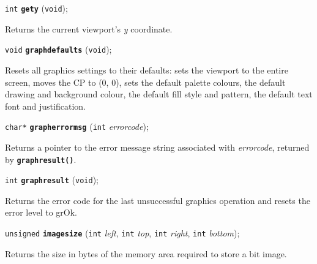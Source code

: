 \documentclass[a4paper,12pt]{article}
\newcommand{\V}{\texttt{void}}      %
\newcommand{\I}{\texttt{int}}       %
\newcommand{\func}[1]{\textbf{\texttt{#1}}}  %
\newcommand{\A}[1]{\emph{#1}}       %
\newenvironment{bgi}
{ %
  \begin{snugshade}
}
{ %
  \end{snugshade}
}
\begin{document}
\begin{bgi}
\I{} \func{gety} (\V{});
\end{bgi}

Returns the current viewport's \A{y} coordinate.


\label{sec:graphdefaults}

\begin{bgi}
\V{} \func{graphdefaults} (\V{});
\end{bgi}

Resets all graphics settings to their defaults: sets the viewport to
the entire screen, moves the CP to (0, 0), sets the default palette
colours, the default drawing and background colour, the default fill
style and pattern, the default text font and justification.


\label{sec:grapherrormsg}

\begin{bgi}
\texttt{char*} \func{grapherrormsg} (\I{} \A{errorcode});
\end{bgi}

Returns a pointer to the error message string associated with
\A{errorcode}, returned by \func{graphresult()}.


\label{sec:graphresult}

\begin{bgi}
\I{} \func{graphresult} (\V{});
\end{bgi}

Returns the error code for the last unsuccessful graphics operation
and resets the error level to grOk.


\label{sec:imagesize}

\begin{bgi}
\texttt{unsigned} \func{imagesize} (\I{} \A{left}, \I{} \A{top}, \I{}
\A{right}, \I{} \A{bottom});
\end{bgi}

Returns the size in bytes of the memory area required to store a bit
image.


\label{sec:initgraph}
\end{document}
